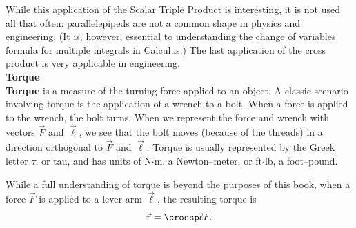 While this application of the Scalar Triple Product is interesting, it is not used all that often: parallelepipeds are not a common shape in physics and engineering. (It is, however, essential to understanding the change of variables formula for multiple integrals in Calculus.) The last application of the cross product is very applicable in engineering.\\

\noindent\textbf{Torque}\\

\textbf{Torque} is a measure of the turning force applied to an object. A classic scenario involving torque is the application of a wrench to a bolt. When a force is applied to the wrench, the bolt turns. When we represent the force and wrench with vectors $\vec F$ and $\vec \ell$, we see that the bolt moves (because of the threads) in a  direction orthogonal to $\vec F$ and $\vec \ell$. Torque is usually represented by the Greek letter $\tau$, or tau, and has units of N$\cdot$m, a Newton--meter, or ft$\cdot$lb, a foot--pound.

While a full understanding of torque is beyond the purposes of this book, when a force $\vec F$ is applied to a lever arm $\vec \ell$, the resulting torque is \begin{equation}\vec \tau = \crossp \ell F.\label{eq:crossp3}\end{equation}

